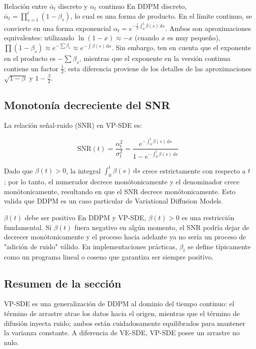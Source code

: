 \documentclass[a4paper]{article}
\begin{document}
\begin{knowledgebox}{Relación entre $\bar{\alpha}_t$ discreto y $\alpha_t$ continuo}
En DDPM discreto, $\bar{\alpha}_t = \prod_{s=1}^t (1-\beta_s)$, lo cual es una forma de producto. En el límite continuo, se convierte en una forma exponencial $\alpha_t = e^{-\frac{1}{2}\int_0^t \beta(s)\,\mathrm{d}s}$. Ambos son aproximaciones equivalentes: utilizando $\ln(1-x) \approx -x$ (cuando $x$ es muy pequeño), $\prod(1-\beta_s) \approx e^{-\sum \beta_s} \approx e^{-\int \beta(s)\,\mathrm{d}s}$. Sin embargo, ten en cuenta que el exponente en el producto es $-\sum \beta_s$, mientras que el exponente en la versión continua contiene un factor $\frac{1}{2}$; esta diferencia proviene de los detalles de las aproximaciones $\sqrt{1-\beta}$ y $1-\frac{\beta}{2}$.
\end{knowledgebox}

\subsection{Monotonía decreciente del SNR}

La relación señal-ruido (SNR) en VP-SDE es:

$$
\mathrm{SNR}(t) = \frac{\alpha_t^2}{\sigma_t^2} = \frac{e^{-\int_0^t \beta(s)\,\mathrm{d}s}}{1 - e^{-\int_0^t \beta(s)\,\mathrm{d}s}}
$$

Dado que $\beta(t) > 0$, la integral $\int_0^t \beta(s)\,\mathrm{d}s$ crece estrictamente con respecto a $t$; por lo tanto, el numerador decrece monótonicamente y el denominador crece monótonicamente, resultando en que el SNR decrece monótonicamente. Esto valida que DDPM es un caso particular de Variational Diffusion Models.

\begin{warningbox}{$\beta(t)$ debe ser positivo}
En DDPM y VP-SDE, $\beta(t) > 0$ es una restricción fundamental. Si $\beta(t)$ fuera negativo en algún momento, el SNR podría dejar de decrecer monótonicamente y el proceso hacia adelante ya no sería un proceso de "adición de ruido" válido. En implementaciones prácticas, $\beta_t$ se define típicamente como un programa lineal o coseno que garantiza ser siempre positivo.
\end{warningbox}

\subsection{Resumen de la sección}

VP-SDE es una generalización de DDPM al dominio del tiempo continuo: el término de arrastre atrae los datos hacia el origen, mientras que el término de difusión inyecta ruido; ambos están cuidadosamente equilibrados para mantener la varianza constante. A diferencia de VE-SDE, VP-SDE posee un arrastre no nulo.
\end{document}
